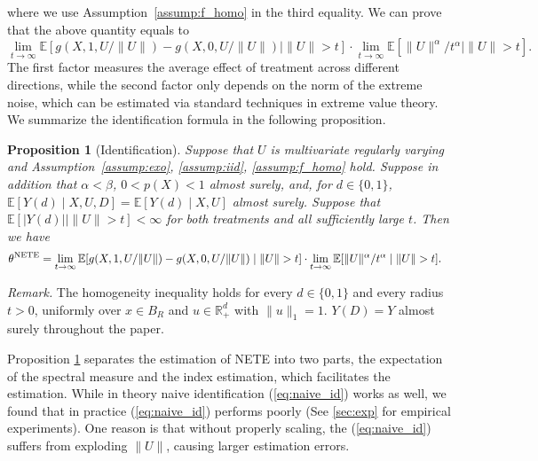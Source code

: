 \documentclass[12pt]{article}
\theoremstyle{plain}
\newtheorem{proposition}[theorem]{Proposition}
\theoremstyle{definition}
\begin{document}
where we use Assumption~\ref{assump:f_homo} in the third equality. We can prove that the above quantity equals to
\[ \lim_{t \rightarrow \infty} \mathbb{E}[g (X, 1, U /\|U\|) - g (X, 0, U
   /\|U\|) \mid \|U\|> t] \cdot \lim_{t \rightarrow \infty}
   \mathbb{E}[\|U\|^{\alpha} / t^{\alpha} \mid \|U\|> t] . \]
The first factor measures the average effect of treatment across different
directions, while the second factor only depends on the norm of the extreme
noise, which can be estimated via standard techniques in extreme value theory.
We summarize the identification formula in the following proposition.

\begin{proposition}
  [Identification]\label{prop:id} Suppose that $U$ is multivariate regularly varying and Assumption~\ref{assump:exo}, \ref{assump:iid}, \ref{assump:f_homo} hold. Suppose in addition that $\alpha<\beta$, $0<p(X)<1$ almost surely, and, for $d\in\{0,1\}$, $\mathbb E[Y(d)\mid X,U,D]=\mathbb E[Y(d)\mid X,U]$ almost surely. Suppose that $\mathbb E[|Y(d)|\mid\|U\|>t]<\infty$ for both treatments and all sufficiently large $t$. Then we have \begin{align*} \theta^{\tmop{NETE}} &= \lim_{t\rightarrow\infty}\mathbb E[g(X,1,U/\|U\|)-g(X,0,U/\|U\|)\mid\|U\|>t]\cdot\lim_{t\rightarrow\infty}\mathbb E[\|U\|^{\alpha}/t^{\alpha}\mid\|U\|>t]. \end{align*}
\end{proposition}

\noindent\textit{Remark.} The homogeneity inequality holds for every $d\in\{0,1\}$ and every radius $t>0$, uniformly over $x\in B_R$ and $u\in\mathbb R_+^d$ with $\|u\|_1=1$. $Y(D)=Y$ almost surely throughout the paper.


Proposition \ref{prop:id} separates the estimation of NETE into two parts, the expectation of the spectral measure and the index estimation, which facilitates the estimation. While in theory naive identification (\ref{eq:naive_id}) works as well, we found that in practice (\ref{eq:naive_id}) performs poorly (See \cref{sec:exp} for empirical experiments). One reason is that without properly scaling, the (\ref{eq:naive_id}) suffers from exploding $\|U\|$, causing larger estimation errors. 

\end{document}

